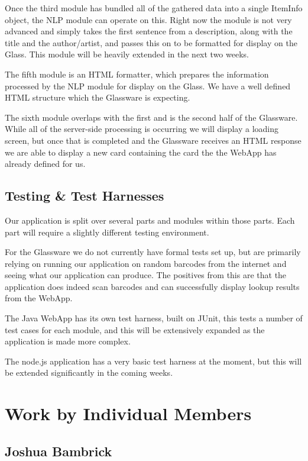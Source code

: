 \documentclass[12pt,a4paper]{report}
\begin{document}
Once the third module has bundled all of the gathered data into a single ItemInfo object, the NLP module can operate on this. Right now the module is not very advanced and simply takes the first sentence from a description, along with the title and the author/artist, and passes this on to be formatted for display on the Glass. This module will be heavily extended in the next two weeks.

The fifth module is an HTML formatter, which prepares the information processed by the NLP module for display on the Glass. We have a well defined HTML structure which the Glassware is expecting.

The sixth module overlaps with the first and is the second half of the Glassware. While all of the server-side processing is occurring we will display a loading screen, but once that is completed and the Glassware receives an HTML response we are able to display a new card containing the card the the WebApp has already defined for us.

\section{Testing \& Test Harnesses}

Our application is split over several parts and modules within those parts. Each part will require a slightly different testing environment. 

For the Glassware we do not currently have formal tests set up, but are primarily relying on running our application on random barcodes from the internet and seeing what our application can produce. The positives from this are that the application does indeed scan barcodes and can successfully display lookup results from the WebApp.

The Java WebApp has its own test harness, built on JUnit, this tests a number of test cases for each module, and this will be extensively expanded as the application is made more complex.

The node.js application has a very basic test harness at the moment, but this will be extended significantly in the coming weeks.

\chapter{Work by Individual Members}

\section{Joshua Bambrick}
\end{document}
